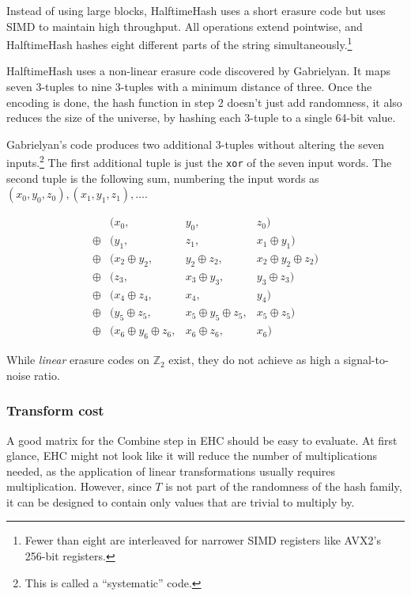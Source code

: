 \documentclass[sigconf, nonacm]{acmart}
\newcommand{\ints}{\mathbb{Z}}
\begin{document}
Instead of using large blocks, HalftimeHash uses a short erasure code but uses SIMD to maintain high throughput.
All operations extend pointwise, and HalftimeHash hashes eight different parts of the string simultaneously.\footnote{Fewer than eight are interleaved for narrower SIMD registers like AVX2's 256-bit registers.}

HalftimeHash uses a non-linear erasure code discovered by Gabrielyan. \cite{9-7-erasure-code}
It maps seven 3-tuples to nine 3-tuples with a minimum distance of three.
Once the encoding is done, the hash function in step 2 doesn't just add randomness, it also reduces the size of the universe, by hashing each 3-tuple to a single 64-bit value.

Gabrielyan's code produces two additional 3-tuples without altering the seven inputs.\footnote{This is called a ``systematic'' code.}
The first additional tuple is just the \texttt{xor} of the seven input words.
The second tuple is the following sum, numbering the input words as $(x_0, y_0, z_0), (x_1, y_1, z_1), \dots$.

\begin{displaymath}
  \begin{array}{rlcr}
       & (x_0, & y_0, & z_0)\\
\oplus & (y_1,  & z_1,  & x_1 \oplus{} y_1) \\
\oplus & (x_2 \oplus{} y_2,& y_2 \oplus{} z_2,& x_2 \oplus{} y_2 \oplus{} z_2)\\
\oplus & (z_3,    &x_3 \oplus{} y_3,& y_3 \oplus{} z_3) \\
\oplus & (x_4 \oplus{} z_4,& x_4,& y_4)\\
\oplus & (y_5 \oplus{} z_5,& x_5 \oplus{} y_5 \oplus{} z_5,& x_5\oplus{}z_5)\\
\oplus & (x_6 \oplus{} y_6 \oplus{} z_6,& x_6 \oplus{} z_6,& x_6)
  \end{array}
\end{displaymath}

While {\em linear} erasure codes on $\ints_2$ exist, they do not achieve as high a signal-to-noise ratio.

\subsubsection{Transform cost}

A good matrix for the Combine step in EHC should be easy to evaluate.
At first glance, EHC might not look like it will reduce the number of multiplications needed, as the application of linear transformations usually requires multiplication.
However, since $T$ is not part of the randomness of the hash family, it can be designed to contain only values that are trivial to multiply by.
\end{document}
